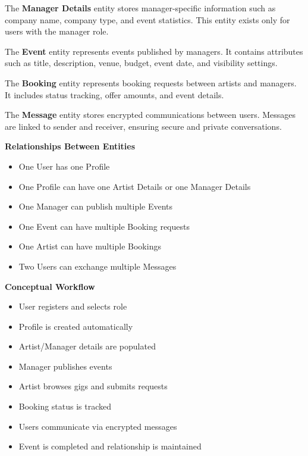 \documentclass[12pt,a4paper]{report}
\begin{document}
The \textbf{Manager Details} entity stores manager-specific information such as company name, company type, and event statistics. This entity exists only for users with the manager role.

The \textbf{Event} entity represents events published by managers. It contains attributes such as title, description, venue, budget, event date, and visibility settings.

The \textbf{Booking} entity represents booking requests between artists and managers. It includes status tracking, offer amounts, and event details.

The \textbf{Message} entity stores encrypted communications between users. Messages are linked to sender and receiver, ensuring secure and private conversations.

\textbf{Relationships Between Entities}

\begin{itemize}
\item One User has one Profile

\item One Profile can have one Artist Details or one Manager Details

\item One Manager can publish multiple Events

\item One Event can have multiple Booking requests

\item One Artist can have multiple Bookings

\item Two Users can exchange multiple Messages
\end{itemize}

\textbf{Conceptual Workflow}

\begin{itemize}
\item User registers and selects role

\item Profile is created automatically

\item Artist/Manager details are populated

\item Manager publishes events

\item Artist browses gigs and submits requests

\item Booking status is tracked

\item Users communicate via encrypted messages

\item Event is completed and relationship is maintained
\end{itemize}
\end{document}
